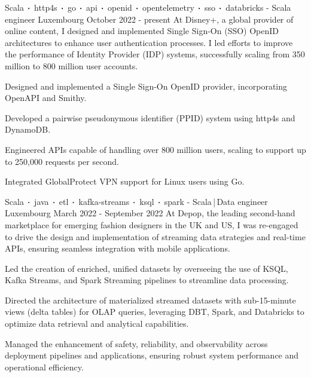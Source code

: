 \begin{cventries}
    \cventry
    {Scala$\sqbig$http4s$\sqbig$go$\sqbig$api$\sqbig$openid$\sqbig$opentelemetry$\sqbig$sso$\sqbig$databricks}
    { - Scala engineer}
    {Luxembourg}
    {October 2022 - present}
    {At Disney+, a global provider of online content, I designed and implemented Single Sign-On (SSO) OpenID architectures to enhance user authentication processes. I led efforts to improve the performance of Identity Provider (IDP) systems, successfully scaling from 350 million to 800 million user accounts.}
    {
        \begin{cvitems}
            \item{Designed and implemented a Single Sign-On OpenID provider, incorporating OpenAPI and Smithy.}
            \item{Developed a pairwise pseudonymous identifier (PPID) system using http4s and DynamoDB.}
            \item{Engineered APIs capable of handling over 800 million users, scaling to support up to 250,000 requests per second.}
            \item{Integrated GlobalProtect VPN support for Linux users using Go.}
        \end{cvitems}
    }

    \cventry
    {Scala$\sqbig$java$\sqbig$etl$\sqbig$kafka-streams$\sqbig$ksql$\sqbig$spark}
    { - Scala\,|\,Data engineer}
    {Luxembourg}
    {March 2022 - September 2022}
    {At Depop, the leading second-hand marketplace for emerging fashion designers in the UK and US, I was re-engaged to drive the design and implementation of streaming data strategies and real-time APIs, ensuring seamless integration with mobile applications.}
    {
        \begin{cvitems}
            \item{Led the creation of enriched, unified datasets by overseeing the use of KSQL, Kafka Streams, and Spark Streaming pipelines to streamline data processing.}
            \item{Directed the architecture of materialized streamed datasets with sub-15-minute views (delta tables) for OLAP queries, leveraging DBT, Spark, and Databricks to optimize data retrieval and analytical capabilities.}
            \item{Managed the enhancement of safety, reliability, and observability across deployment pipelines and applications, ensuring robust system performance and operational efficiency.}
        \end{cvitems}
    }


\end{cventries}
